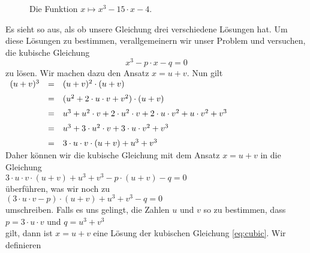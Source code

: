 \begin{figure}[!ht]
  \centering
  \caption{Die Funktion $x \mapsto x^3 - 15 \cdot x - 4$.}
  \label{fig:cubic.eps}
\end{figure}

Es sieht so aus, als ob unsere Gleichung drei verschiedene Lösungen hat.  Um diese Lösungen zu bestimmen,
verallgemeinern wir unser Problem und versuchen, die kubische Gleichung
\begin{equation}
  \label{eq:cubic}
  x^3 - p \cdot x - q = 0  
\end{equation}
zu lösen.  Wir machen dazu den Ansatz $x = u + v$.  Nun gilt
\\[0.2cm]
\hspace*{1.3cm}
$
\begin{array}[t]{lcl}
(u + v)^3 & = & (u + v)^2 \cdot (u + v)                                                           \\[0.2cm]
          & = & (u^2 + 2 \cdot u \cdot v + v^2) \cdot (u + v)                                     \\[0.2cm]
          & = & u^3 + u^2 \cdot v + 2 \cdot u^2 \cdot v + 2 \cdot u \cdot v^2 + u \cdot v^2 + v^3 \\[0.2cm]
          & = & u^3 + 3 \cdot u^2 \cdot v + 3 \cdot u \cdot v^2 + v^3                             \\[0.2cm]
          & = & 3 \cdot u \cdot v \cdot (u + v) + u^3 + v^3 
\end{array}
$
\\[0.2cm]
Daher können wir die kubische Gleichung mit dem Ansatz $x = u + v$ in die Gleichung
\\[0.2cm]
\hspace*{1.3cm}
$3 \cdot u \cdot v \cdot (u + v) + u^3 + v^3 - p \cdot (u + v) - q = 0$
\\[0.2cm]
überführen, was wir noch zu
\\[0.2cm]
\hspace*{1.3cm}
$(3 \cdot u \cdot v - p) \cdot (u + v) + u^3 + v^3 - q = 0$
\\[0.2cm]
umschreiben.  Falls es uns gelingt, die Zahlen $u$ und $v$ so zu bestimmen, dass
\\[0.2cm]
\hspace*{1.3cm}
$p = 3 \cdot u \cdot v$ \quad und \quad $q = u^3 + v^3$
\\[0.2cm]
gilt, dann ist $x = u + v$ eine Lösung der kubischen Gleichung \ref{eq:cubic}.  Wir definieren
\\[0.2cm]
